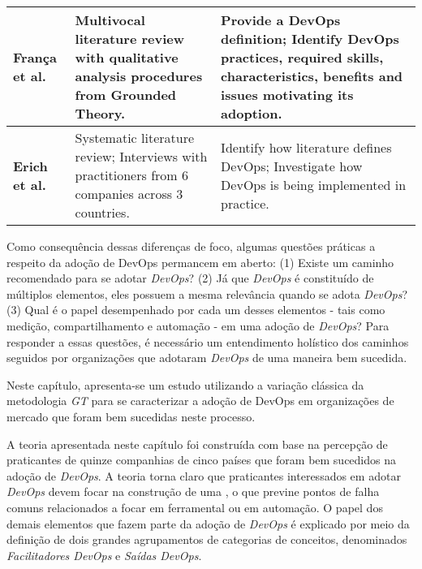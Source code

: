 \begin{table}[hb!]
\begin{tabular}{|p{3cm}|p{6cm}|p{6cm}|}
\textbf{Fran\c{c}a et al.~\cite{characterizing_devops}}

& Multivocal literature review with qualitative analysis procedures from
Grounded Theory.

& Provide a DevOps definition; \newline \newline
Identify DevOps practices, required skills, characteristics, benefits and
issues motivating its adoption.  \\

\hline

\textbf{Erich et al.~\cite{qualitative_devops_journalsw_17}}

& Systematic literature review; \newline \newline
Interviews with practitioners from 6 companies across 3 countries.

& Identify how literature defines DevOps; \newline \newline
Investigate how DevOps is being implemented in practice. \\

\hline

\end{tabular}
\end{table}

Como consequência dessas diferenças de foco, algumas questões práticas a
respeito da adoção de DevOps permancem em aberto: (1) Existe um caminho
recomendado para se adotar \textit{DevOps}? (2) Já que \textit{DevOps} é
constituído de múltiplos elementos, eles
possuem a mesma relevância quando se adota \textit{DevOps}? (3) Qual é o papel
desempenhado por cada um desses elementos - tais como medição, compartilhamento e
automação - em uma adoção de \textit{DevOps}? Para responder a essas questões,
é necessário um entendimento holístico dos caminhos seguidos por organizações
que adotaram \textit{DevOps} de uma maneira bem sucedida.

Neste capítulo, apresenta-se um estudo utilizando a variação clássica da
metodologia \textit{\acrfull{GT}} para se caracterizar a adoção de DevOps
em organizações de mercado que foram bem sucedidas neste processo.

A teoria apresentada neste capítulo foi construída com base na percepção de
praticantes de quinze companhias de cinco países que foram bem sucedidos na
adoção de \textit{DevOps}. A teoria torna claro que praticantes interessados em
adotar \textit{DevOps} devem focar na construção de uma , o que previne pontos de falha comuns relacionados a focar em
ferramental ou em automação. O papel dos demais elementos que fazem parte da
adoção de \textit{DevOps} é explicado por meio da definição de dois grandes
agrupamentos de categorias de conceitos, denominados \emph{Facilitadores DevOps}
e \emph{Saídas DevOps}.

